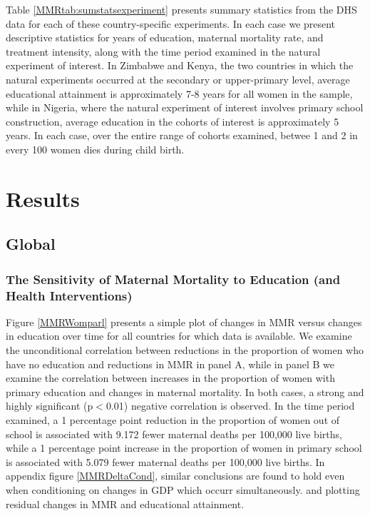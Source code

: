 \documentclass{article}[12pt,subeqn]
\begin{document}
\begin{spacing}{1.4}
Table \ref{MMRtab:sumstatsexperiment} presents summary statistics from the DHS 
data for each of these country-specific experiments.  In each case we present 
descriptive statistics for years of education, maternal mortality rate, and 
treatment intensity, along with the time period examined in the natural 
experiment of interest.  In Zimbabwe and Kenya, the two countries in which the 
natural experiments occurred at the secondary or upper-primary level, average 
educational attainment is approximately 7-8 years for all women in the sample, 
while in Nigeria, where the natural experiment of interest involves primary school 
construction, average education in the cohorts of interest is approximately 5 
years.  In each case, over the entire range of cohorts examined, betwee 1 and 2 
in every 100 women dies during child birth.


\section{Results}
\subsection{Global}
\subsubsection{The Sensitivity of Maternal Mortality to Education (and Health 
  Interventions)}
Figure \ref{MMRWomparl} presents a simple plot of changes in MMR versus changes
in education over time for all countries for which data is available. We examine
the unconditional correlation between reductions in the proportion of women who
have no education and reductions in MMR in panel A, while in panel B we examine
the correlation between increases in the proportion of women with primary
education and changes in maternal mortality.  In both cases, a strong and highly
significant (p$<$0.01) negative correlation is observed. In the time period
examined, a 1 percentage point reduction in the proportion of women out of school
is associated with 9.172 fewer maternal deaths per 100,000 live births, while a 1
percentage point increase in the proportion of women in primary school is
associated with 5.079 fewer maternal deaths per 100,000 live births.  In
appendix figure \ref{MMRDeltaCond}, similar conclusions are found to hold even
when conditioning on changes in GDP which occurr simultaneously. and plotting
residual changes in MMR and educational attainment.


\end{spacing}
\end{document}

